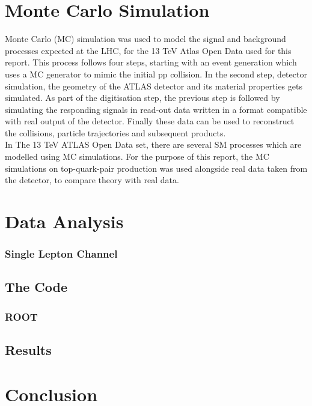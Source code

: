 \documentclass[11pt,a4paper]{article}
\begin{document}

\section{Monte Carlo Simulation}
Monte Carlo (MC) simulation was used to model the signal and background
processes expected at the LHC, for the 13 TeV Atlas Open Data used for this
report. This process follows four steps, starting with an event generation which
uses a MC generator to mimic the initial pp collision. In the second step,
detector simulation, the geometry of the ATLAS detector and its material
properties gets simulated. As part of the digitisation step, the previous step
is followed by simulating the responding signals in read-out data written in a
format compatible with real output of the detector. Finally these data can be
used to reconstruct the collisions, particle trajectories and subsequent products.\\

In The 13 TeV ATLAS Open Data set, there are several SM processes which are
modelled using MC simulations. For the purpose of this report, the MC
simulations on top-quark-pair production was used alongside real data taken from
the detector, to compare theory with real data.

\section{Data Analysis}

\subsubsection{Single Lepton Channel}

\subsection{The Code}

\subsubsection{ROOT}

\subsection{Results}

\section{Conclusion}

\printbibliography
\end{document}
